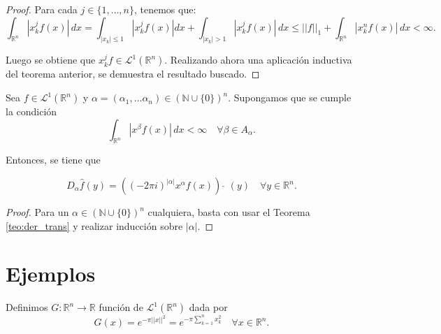 \begin{proof}
Para cada $j \in \{1, \ldots ,n \}$, tenemos que:
\begin{equation}
    \int_{\mathbb{R}^n}|x_{k}^{j}f(x)| \, dx = \int_{|x_k|\leq 1}|x_{k}^{j}f(x)|dx+\int_{|x_k|>1}|x_{k}^{j}f(x)| \, dx\leq ||f||_1 +  \int_{\mathbb{R}^n }|x_{k}^{n}f(x)| \, dx < \infty.
\end{equation}

\noindent Luego se obtiene que $x_{k}^jf \in \mathscr{L}^1(\mathbb{R}^n)$. Realizando ahora una aplicación inductiva del teorema anterior, se demuestra el resultado buscado.
\end{proof}

\begin{teorema}\label{teo:der_trans}
   Sea $f \in \mathscr{L}^1(\mathbb{R}^n)$ y $\alpha = (\alpha_1, \ldots \alpha_n) \in (\mathbb{N} \cup \{0\})^n$. Supongamos que se cumple la condición 
   \begin{equation}\int_{\mathbb{R}^n}|x^{\beta}f(x)| \, dx < \infty  \quad \forall \beta \in A_{\alpha}.
   \end{equation}
   
\noindent Entonces, se tiene que
  
   \begin{equation}
     D_{\alpha}\widehat{f}(y) = ((-2 \pi i)^{|\alpha|}x^{\alpha} f (x))\,\,\widehat{  } \,\, (y) \quad \forall y \in \mathbb{R}^n.
   \end{equation}
\end{teorema} 


\begin{proof}
     Para un $\alpha \in ( \mathbb{N} \cup \{0\})^n$ cualquiera, basta con usar el Teorema \ref{teo:der_trans} y realizar inducción sobre $|\alpha|$.
\end{proof}



\section{Ejemplos}
\begin{definicion}\label{gauss}
    Definimos $G : \mathbb{R}^n \rightarrow \mathbb{R}$ función de $  \mathscr{L}^1(\mathbb{R}^n)$ dada por
    \begin{equation}
        G(x) = e^{- \pi ||x||^2} =  e^{- \pi\sum\limits_{k=1}^{n} x_k^2} \quad \forall x \in \mathbb{R}^n.
    \end{equation}
\end{definicion}


